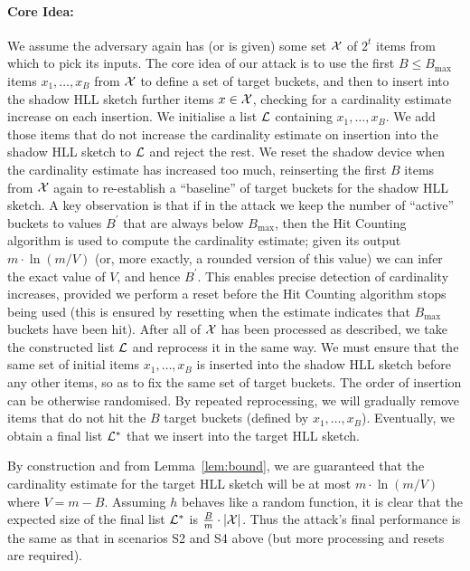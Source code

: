 \documentclass{article}
\begin{document}
\paragraph{Core Idea:}
We assume the adversary again has (or is given) some set ${\cal X}$ of $2^t$ items from which to pick its inputs. The core idea of our attack is to use the first $B \leq B_{\max}$ items $x_1,\ldots, x_B$ from ${\cal X}$ to define a set of target buckets, and then to insert into the shadow HLL sketch further items $x \in {\cal X}$, checking for a cardinality estimate increase on each insertion. We initialise a list ${\cal L}$ containing $x_1,\ldots, x_B$. We add those items that do not increase the cardinality estimate on insertion into the shadow HLL sketch to ${\cal L}$ and reject the rest. We reset the shadow device when the cardinality estimate has increased too much, reinserting the first $B$ items from ${\cal X}$ again to re-establish a ``baseline'' of target buckets for the shadow HLL sketch. A key observation is that if in the attack we keep the number of ``active'' buckets to values $B^\prime$ that are always below $B_{\max}$, then the Hit Counting algorithm is used to compute the cardinality estimate; given its output $m \cdot \ln (m/V)$ (or, more exactly, a rounded version of this value) we can infer the exact value of $V$, and hence $B^\prime$. This enables precise detection of cardinality increases, provided we perform a reset before the Hit Counting algorithm stops being used (this is ensured by resetting when the estimate indicates that $B_{\max}$ buckets have been hit). After all of ${\cal X}$ has been processed as described, we take the constructed list ${\cal L}$ and reprocess it in the same way. We must ensure that the same set of initial items $x_1,\ldots, x_B$ is inserted into the shadow HLL sketch before any other items, so as to fix the same set of target buckets. The order of insertion can be otherwise randomised. %
By repeated reprocessing, we will gradually remove items that do not hit the $B$ target buckets (defined by $x_1,\ldots, x_B$). Eventually, we obtain a final list ${\cal L}^*$ that we insert into the target HLL sketch. 

By construction and from Lemma~\ref{lem:bound}, we are guaranteed that the cardinality estimate for the target HLL sketch will be at most $m \cdot \ln (m/V)$ where $V = m-B$. Assuming $h$ behaves like a random function, it is clear that the expected size of the final list ${\cal L}^*$ is $\frac{B}{m}\cdot |{\cal X}|$. Thus the attack's final performance is the same as that in scenarios S2 and S4 above (but more processing and resets are required).
\end{document}

